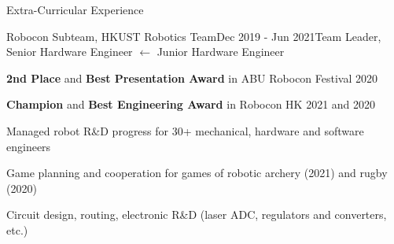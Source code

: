 \documentclass{resume}
\begin{document}
\begin{rSection}{Extra-Curricular Experience}
    
    \begin{rSubsection}{Robocon Subteam, HKUST Robotics Team}{Dec 2019 - Jun 2021}{Team Leader, Senior Hardware Engineer $\leftarrow$ Junior Hardware Engineer}{}
        \item \textbf{2nd Place} and \textbf{Best Presentation Award} in ABU Robocon Festival 2020
        \item \textbf{Champion} and \textbf{Best Engineering Award} in Robocon HK 2021 and 2020
        \item Managed robot R\&D progress for 30+ mechanical, hardware and software engineers
        \item Game planning and cooperation for games of robotic archery (2021) and rugby (2020)
        \item Circuit design, routing, electronic R\&D (laser ADC, regulators and converters, etc.)
    \end{rSubsection}

\end{rSection}
\end{document}
